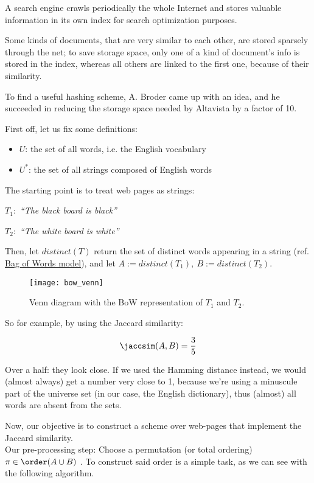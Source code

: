 A search engine crawls periodically the whole Internet and stores valuable information in its own index for search optimization purposes.

\begin{obs}
	Some kinds of documents, that are very similar to each other, are stored sparsely through the net; to save storage space, only one of a kind of document's info is stored in the index, whereas all others are linked to the first one, because of their similarity.
\end{obs}

To find a useful hashing scheme, A. Broder came up with an idea, and he succeeded in reducing the storage space needed by Altavista by a factor of 10.

First off, let us fix some definitions:
\begin{itemize}
\item $U$: the set of all words, i.e. the English vocabulary
\item $U^*$: the set of all strings composed of English words
\end{itemize}

The starting point is to treat web pages as strings:

$T_1:$ \textit{``The black board is black''}

$T_2:$ \textit{``The white board is white''}

Then, let $distinct(T)$ return the set of distinct words appearing in a string (ref. \href{https://en.wikipedia.org/wiki/Bag-of-words_model}{Bag of Words model}), and let $A:=distinct(T_1),\ B:=distinct(T_2)$.

\begin{figure}
	\centering
	\texttt{[image: bow\_venn]}
	\caption{Venn diagram with the BoW representation of $T_1$ and $T_2$.}
	\label{fig:bow_venn}
\end{figure}

So for example, by using the Jaccard similarity:

\begin{equation}
\jaccsim(A, B)= \frac{3}{5}
\end{equation}

Over a half: they look close. If we used the Hamming distance instead, we would (almost always) get a number very close to 1, because we're using a minuscule part of the universe set (in our case, the English dictionary), thus (almost) all words are absent from the sets.

Now, our objective is to construct a scheme over web-pages that implement the Jaccard similarity.\\
Our pre-processing step: Choose a permutation (or total ordering) $\pi \in \order(A \cup B)$ \uar. To construct said order is a simple task, as we can see with the following algorithm.


